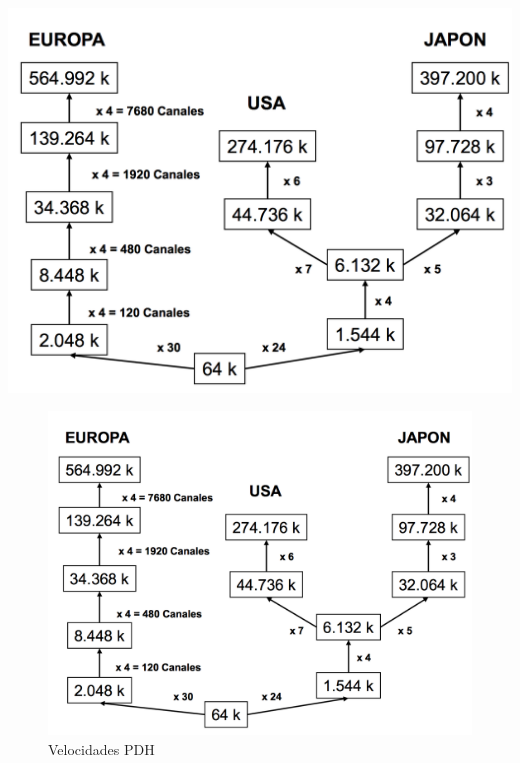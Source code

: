 \documentclass[10pt,portrait, twocolumn]{article}
\makeatletter
\renewcommand{\subsubsection}{\@startsection{subsubsection}{3}{0mm}%
                                {-1ex plus -.5ex minus -.2ex}%
                                {1ex plus .2ex}%
                                {\normalfont\small\bfseries}}
\makeatother
\begin{document}
	\begin{center}
		\includegraphics[scale=0.2]{images/VelocidadPDH}
	\end{center}

	\begin{figure}[!ht]
 		\centering
  		 \includegraphics[scale = 0.35]{images/VelocidadPDH}
		\caption{Velocidades PDH}
	\end{figure}


\end{document}
